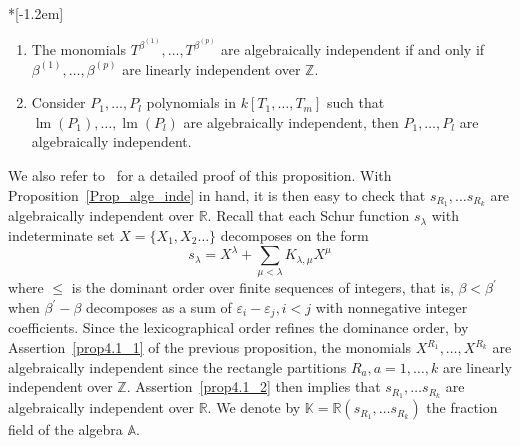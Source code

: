 \documentclass[ALCO,ThmDefs,Unicode,epreuves]{cedram}
\DeclareMathOperator{\lm}{lm}
\begin{document}
\begin{prop}
\label{Prop_alge_inde}\ \\*[-1.2em]

\begin{enumerate}
\item\label{prop4.1_1} The monomials $T^{\beta^{(1)}},\ldots,T^{\beta^{(p)}}$ are algebraically
independent if and only if $\beta^{(1)},\ldots,\beta^{(p)}$ are linearly
independent over $\mathbb{Z}$.

\item\label{prop4.1_2} Consider $P_{1},\ldots,P_{l}$ polynomials in $k[T_{1},\ldots,T_{m}]$
such that $\lm (P_{1}),\ldots,\lm (P_{l})$ are algebraically
independent, then $P_{1},\ldots,P_{l}$ are algebraically independent.
\end{enumerate}
\end{prop}
We also refer to~\cite[Section~3]{Pan} for a detailed proof of this proposition. With Proposition~\ref{Prop_alge_inde} in hand, it is then easy to check that
$s_{R_{1}},\ldots s_{R_{k}}$ are algebraically independent over $\mathbb{R}$.
Recall that each Schur function $s_{\lambda}$ with indeterminate set
$X=\{X_{1},X_{2}\ldots\}$ decomposes on the form%
\[
s_{\lambda}=X^{\lambda}+\sum_{\mu<\lambda}K_{\lambda,\mu}X^{\mu}%
\]
where $\leq$ is the dominant order over finite sequences of integers, that is,
$\beta<\beta^{\prime}$ when $\beta^{\prime}-\beta$ decomposes as a sum of
$\varepsilon_{i}-\varepsilon_{j},i<j$ with nonnegative integer coefficients.
Since the lexicographical order refines the dominance order,
by Assertion~\eqref{prop4.1_1} of the previous proposition, the monomials $X^{R_{1}}%
,\ldots,X^{R_{k}}$ are algebraically independent since the rectangle
partitions $R_{a},a=1,\ldots,k$ are linearly independent over $\mathbb{Z}$.
Assertion~\eqref{prop4.1_2} then implies that $s_{R_{1}},\ldots s_{R_{k}}$ are algebraically
independent over $\mathbb{R}$. We denote by $\mathbb{K}=\mathbb{R}(s_{R_{1}%
},\ldots s_{R_{k}})$ the fraction field of the algebra $\mathbb{A}$.
\end{document}
